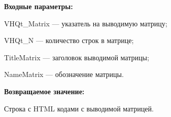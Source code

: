 \textbf{Входные параметры:}

    VHQt\_Matrix --- указатель на выводимую матрицу;
 
    VHQt\_N --- количество строк в матрице;
 
    TitleMatrix --- заголовок выводимой матрицы;
 
    NameMatrix --- обозначение матрицы.

\textbf{Возвращаемое значение:}

Строка с HTML кодами с выводимой матрицей.